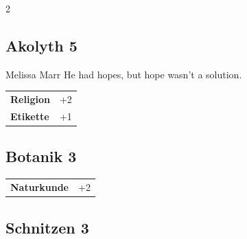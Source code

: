 \begin{multicols}{2}
\begin{tcolorbox}

\end{tcolorbox}

\begin{tcolorbox}
    \subsection*{Akolyth \hfill \small{5 }}
    \tcblower


\begin{pquote}{Melissa Marr}
He had hopes, but hope wasn't a solution.
\end{pquote}

\vspace{3mm}

\begin{tabular}{@{}ll@{}}
    \textbf{Religion} & +2\\
    \textbf{Etikette} & +1\\
\end{tabular}


\end{tcolorbox}

\begin{tcolorbox}
    \subsection*{Botanik \hfill \small{3 }}
    \tcblower




\begin{tabular}{@{}ll@{}}
    \textbf{Naturkunde} & +2\\
\end{tabular}


\end{tcolorbox}

\begin{tcolorbox}
    \subsection*{Schnitzen \hfill \small{3 }}
    \tcblower





\end{tcolorbox}
\end{multicols}
